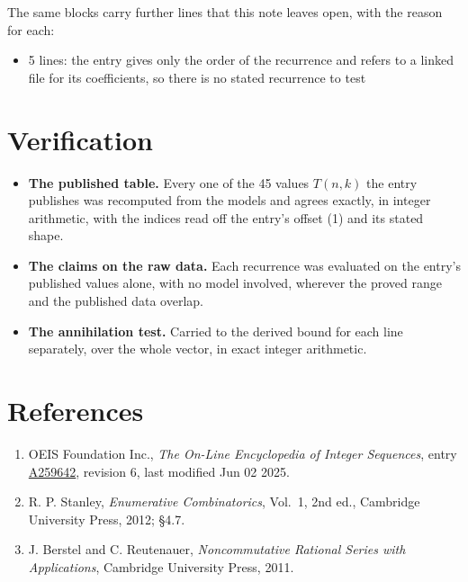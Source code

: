 \documentclass[11pt]{article}
\theoremstyle{definition}
\begin{document}
The same blocks carry further lines that this note leaves open, with the reason for each:

\begin{itemize}

\item 5 lines: the entry gives only the order of the recurrence and refers to a linked file for its coefficients, so there is no stated recurrence to test

\end{itemize}

\section{Verification}

\begin{itemize}

\item {\bfseries The published table.} Every one of the 45 values $T(n,k)$ the entry publishes was recomputed from the models and agrees exactly, in integer arithmetic, with the indices read off the entry's offset (1) and its stated shape.

\item {\bfseries The claims on the raw data.} Each recurrence was evaluated on the entry's published values alone, with no model involved, wherever the proved range and the published data overlap.

\item {\bfseries The annihilation test.} Carried to the derived bound for each line separately, over the whole vector, in exact integer arithmetic.

\end{itemize}

\section{References}

\begin{enumerate}

\item OEIS Foundation Inc., \emph{The On-Line Encyclopedia of Integer Sequences}, entry \href{https://oeis.org/A259642}{A259642}, revision 6, last modified Jun 02 2025.

\item R. P. Stanley, \emph{Enumerative Combinatorics}, Vol.~1, 2nd ed., Cambridge University Press, 2012; \S4.7.

\item J. Berstel and C. Reutenauer, \emph{Noncommutative Rational Series with Applications}, Cambridge University Press, 2011.

\end{enumerate}
\end{document}
